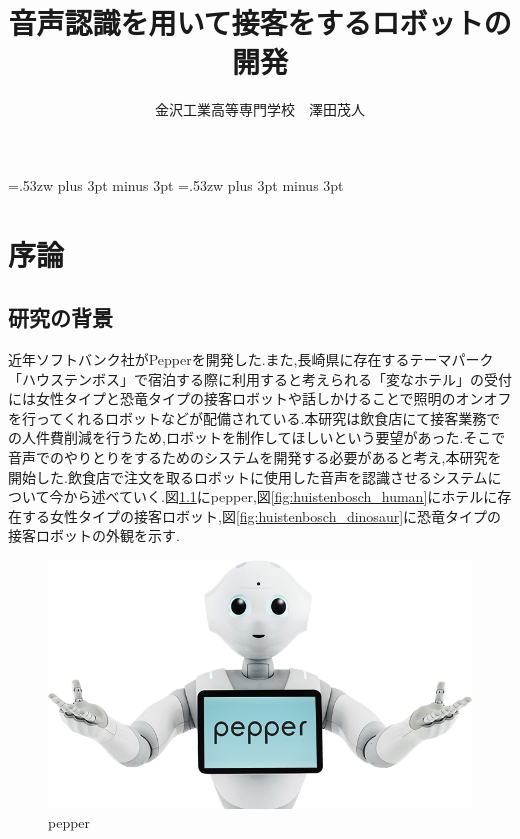 \documentclass[12pt,oneside]{sotsuken_paper}
\title{音声認識を用いて接客をするロボットの開発}
\author{金沢工業高等専門学校　澤田茂人}
\begin{document}
\setlength{\baselineskip}{9truemm}

\kanjiskip=.53zw plus 3pt minus 3pt
\xkanjiskip=.53zw plus 3pt minus 3pt

\tableofcontents


\chapter{序論}
\section{研究の背景}
近年ソフトバンク社がPepperを開発した.また,長崎県に存在するテーマパーク「ハウステンボス」で宿泊する際に利用すると考えられる「変なホテル」の受付には女性タイプと恐竜タイプの接客ロボットや話しかけることで照明のオンオフを行ってくれるロボットなどが配備されている.本研究は飲食店にて接客業務での人件費削減を行うため,ロボットを制作してほしいという要望があった.そこで音声でのやりとりをするためのシステムを開発する必要があると考え,本研究を開始した.飲食店で注文を取るロボットに使用した音声を認識させるシステムについて今から述べていく.図\ref{fig:hospitality-robot}にpepper,図\ref{fig:huistenbosch_human}にホテルに存在する女性タイプの接客ロボット,図\ref{fig:huistenbosch_dinosaur}に恐竜タイプの接客ロボットの外観を示す.


\begin{figure}[htbp]
\begin{center}
\includegraphics[width=120mm]{img/pepper.png}
\caption{pepper}
\label{fig:hospitality-robot}
\end{center}
\end{figure}
\end{document}
